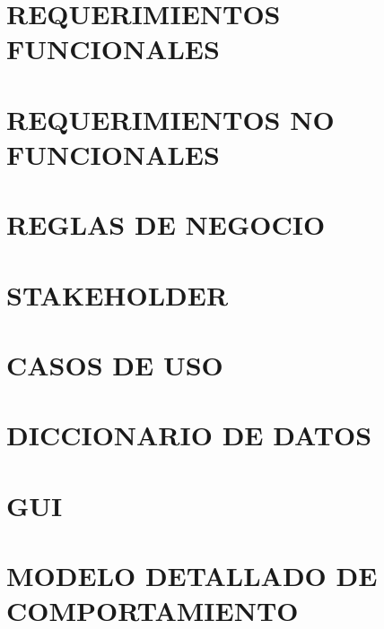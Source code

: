 \section{REQUERIMIENTOS FUNCIONALES}
	
\section{REQUERIMIENTOS NO FUNCIONALES}
	
\section{REGLAS DE NEGOCIO}
	
\section{STAKEHOLDER}
	
	\newpage
\section{CASOS DE USO}
	
	\newpage
\section{DICCIONARIO DE DATOS}
	
	\newpage
\section{GUI}
	
\newpage
\section{MODELO DETALLADO DE COMPORTAMIENTO}
	